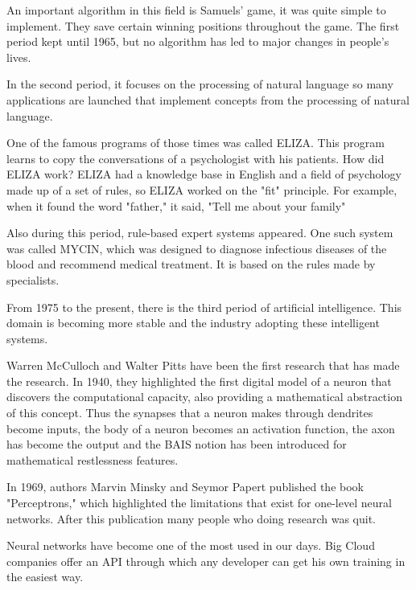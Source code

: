 An important algorithm in this field is Samuels' game, it was quite simple to implement. They save certain winning positions throughout the game.\cite{historyofneuronalnetwork}
The first period kept until 1965, but no algorithm has led to major changes in people's lives. \cite{historyofneuronalnetwork}

In the second period, it focuses on the processing of natural language so many applications
 are launched that implement concepts from the processing of natural language.
 
One of the famous programs of those times was called ELIZA. This program learns to copy the conversations of a psychologist with his patients.
How did ELIZA work? 
ELIZA had a knowledge base in English and a field of psychology made up of a set of rules,  
so ELIZA worked on the "fit" principle.
For example, when it found the word "father," it said, "Tell me about your family" \cite{historyofneuronalnetwork}

 Also during this period, rule-based expert systems appeared. 
One such system was called MYCIN, which was designed to diagnose infectious diseases of the blood and recommend medical treatment. It is based on the rules made by specialists. \cite{historyofneuronalnetwork}

From 1975 to the present, there is the third period of artificial intelligence. 
This domain is becoming more stable and the industry adopting these intelligent systems.

Warren McCulloch and Walter Pitts have been the first research that has made the research. 
In 1940, they highlighted the first digital model of a neuron that discovers the computational capacity, 
also providing a mathematical abstraction of this concept.
Thus the synapses that a neuron makes through dendrites become inputs, 
the body of a neuron becomes an activation function, the axon has become the output and 
the BAIS notion has been introduced for mathematical restlessness features. \cite{historyofneuronalnetworkstanford}


In 1969, authors Marvin Minsky and Seymor Papert published the book "Perceptrons," which highlighted the limitations that exist for one-level neural networks.
After this publication many people who doing research was quit. \cite{historyofneuronalnetworkstanford}

Neural networks have become one of the most used in our days. 
Big Cloud companies offer an API through which any developer can get his own training in the easiest way.
 
